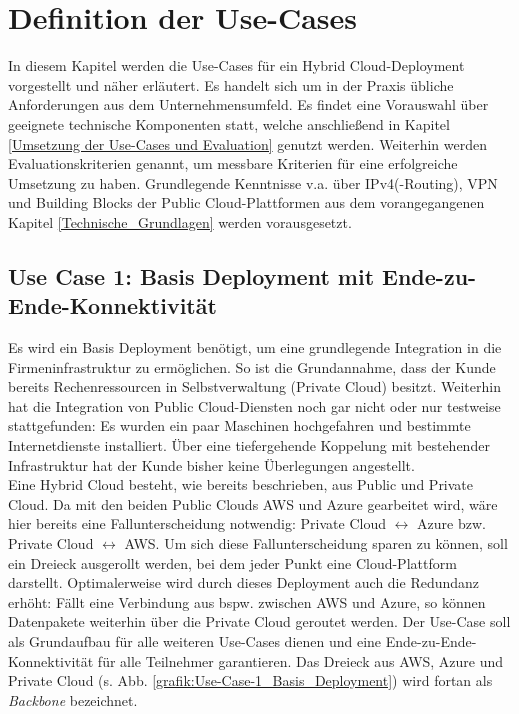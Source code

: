 \chapter{Definition der Use-Cases} \label{Defintion der Use-Cases}
In diesem Kapitel werden die Use-Cases für ein Hybrid Cloud-\gls{Deployment} vorgestellt und näher erläutert. Es handelt sich um in der Praxis übliche Anforderungen aus dem Unternehmensumfeld. Es findet eine Vorauswahl über geeignete technische Komponenten statt, welche anschließend in Kapitel \ref{Umsetzung der Use-Cases und Evaluation} genutzt werden. Weiterhin werden Evaluationskriterien genannt, um messbare Kriterien für eine erfolgreiche Umsetzung zu haben. Grundlegende Kenntnisse v.a. über IPv4(-Routing), VPN und Building Blocks der Public Cloud-Plattformen aus dem vorangegangenen Kapitel \ref{Technische_Grundlagen} werden vorausgesetzt.

\section{Use Case 1: Basis Deployment mit Ende-zu-Ende-Konnektivität}\label{base-deployment}
Es wird ein Basis \gls{Deployment} benötigt, um eine grundlegende Integration in die Firmeninfrastruktur zu ermöglichen. So ist die Grundannahme, dass der Kunde bereits Rechenressourcen in Selbstverwaltung (\glqq Private Cloud\grqq{}) besitzt. Weiterhin hat die Integration von Public Cloud-Diensten noch gar nicht oder nur testweise stattgefunden: Es wurden ein paar Maschinen hochgefahren und bestimmte Internetdienste installiert. Über eine tiefergehende Koppelung mit bestehender Infrastruktur hat der Kunde bisher keine Überlegungen angestellt.\\
Eine Hybrid Cloud besteht, wie bereits beschrieben, aus Public und Private Cloud. Da mit den beiden Public Clouds AWS und Azure gearbeitet wird, wäre hier bereits eine Fallunterscheidung notwendig: Private Cloud $\leftrightarrow$ Azure bzw. Private Cloud $\leftrightarrow$ AWS. Um sich diese Fallunterscheidung sparen zu können, soll ein Dreieck ausgerollt werden, bei dem jeder Punkt eine Cloud-Plattform darstellt.
Optimalerweise wird durch dieses \gls{Deployment} auch die Redundanz erhöht: Fällt eine Verbindung aus bspw. zwischen AWS und Azure, so können Datenpakete weiterhin über die Private Cloud geroutet werden.
Der Use-Case soll als Grundaufbau für alle weiteren Use-Cases dienen und eine Ende-zu-Ende-Konnektivität für alle Teilnehmer garantieren. Das Dreieck aus AWS, Azure und Private Cloud (s. Abb. \ref{grafik:Use-Case-1_Basis_Deployment}) wird fortan als \textit{Backbone} bezeichnet.

